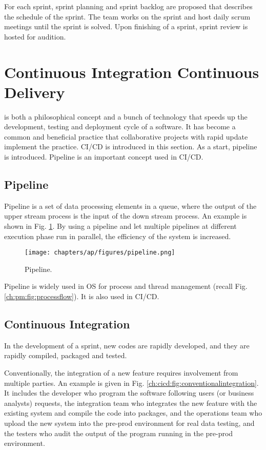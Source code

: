 For each sprint, sprint planning and sprint backlog are proposed that describes the schedule of the sprint. The team works on the sprint and host daily scrum meetings until the sprint is solved. Upon finishing of a sprint, sprint review is hosted for audition.

\section{Continuous Integration Continuous Delivery}

 is both a philosophical concept and a bunch of technology that speeds up the development, testing and deployment cycle of a software. It has become a common and beneficial practice that collaborative projects with rapid update implement the practice. CI/CD is introduced in this section. As a start, pipeline is introduced. Pipeline is an important concept used in CI/CD.

\subsection{Pipeline}

Pipeline is a set of data processing elements in a queue, where the output of the upper stream process is the input of the down stream process. An example is shown in Fig. \ref{ch:cicd:fig:pipeline}. By using a pipeline and let multiple pipelines at different execution phase run in parallel, the efficiency of the system is increased.
\begin{figure}[htbp]
	\centering
	\texttt{[image: chapters/ap/figures/pipeline.png]}
	\caption{Pipeline.} \label{ch:cicd:fig:pipeline}
\end{figure}

Pipeline is widely used in OS for process and thread management (recall Fig. \ref{ch:pm:fig:processflow}). It is also used in CI/CD.

\subsection{Continuous Integration}

In the development of a sprint, new codes are rapidly developed, and they are rapidly compiled, packaged and tested.

Conventionally, the integration of a new feature requires involvement from multiple parties. An example is given in Fig. \ref{ch:cicd:fig:conventionalintegration}. It includes the developer who program the software following users (or business analysts) requests, the integration team who integrates the new feature with the existing system and compile the code into packages, and the operations team who upload the new system into the pre-prod environment for real data testing, and the testers who audit the output of the program running in the pre-prod environment.

